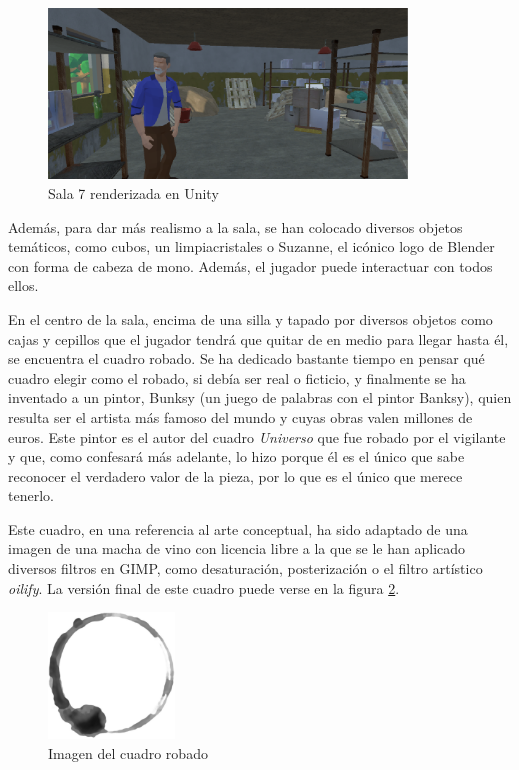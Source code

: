\begin{figure}[!h]
\begin{center}
\includegraphics[width=0.85\textwidth]{imagenes/7/salas-unity/unity-sala-7.png}
\caption{Sala 7 renderizada en Unity}
\label{fig:unity-sala-7}
\end{center}
\vspace{-0.35cm}
\end{figure}

Además, para dar más realismo a la sala, se han colocado diversos objetos temáticos, como cubos, un limpiacristales o Suzanne, el icónico logo de Blender con forma de cabeza de mono. Además, el jugador puede interactuar con todos ellos.

En el centro de la sala, encima de una silla y tapado por diversos objetos como cajas y cepillos que el jugador tendrá que quitar de en medio para llegar hasta él, se encuentra el cuadro robado. Se ha dedicado bastante tiempo en pensar qué cuadro elegir como el robado, si debía ser real o ficticio, y finalmente se ha inventado a un pintor, Bunksy (un juego de palabras con el pintor Banksy), quien resulta ser el artista más famoso del mundo y cuyas obras valen millones de euros. Este pintor es el autor del cuadro \textit{Universo} que fue robado por el vigilante y que, como confesará más adelante, lo hizo porque él es el único que sabe reconocer el verdadero valor de la pieza, por lo que es el único que merece tenerlo.

Este cuadro, en una referencia al arte conceptual, ha sido adaptado de una imagen de una macha de vino con licencia libre a la que se le han aplicado diversos filtros en GIMP, como desaturación, posterización o el filtro artístico \textit{oilify}. La versión final de este cuadro puede verse en la figura \ref{fig:universe}.

\begin{figure}[!h]
\vspace{-0.15cm}
\begin{center}
\includegraphics[width=0.3\textwidth]{imagenes/7/wine-stain.jpg}
\caption{Imagen del cuadro robado}
\label{fig:universe}
\end{center}
\vspace{-0.35cm}
\end{figure}

